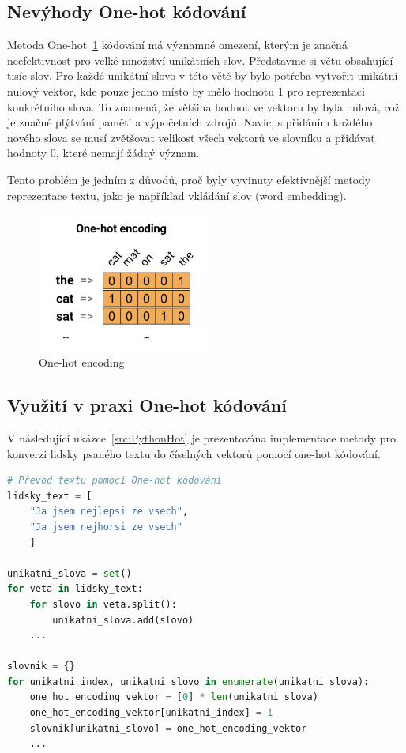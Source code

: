 \subsection{Nevýhody One-hot kódování}
Metoda One-hot~\ref{fig:One-hot encoding} kódování má významné omezení, kterým je značná neefektivnost pro velké množství unikátních slov.
Představme si větu obsahující tisíc slov.
Pro každé unikátní slovo v této větě by bylo potřeba vytvořit unikátní nulový vektor, kde pouze jedno místo by mělo hodnotu 1 pro reprezentaci konkrétního slova.
To znamená, že většina hodnot ve vektoru by byla nulová, což je značné plýtvání pamětí a výpočetních zdrojů.
Navíc, s přidáním každého nového slova se musí zvětšovat velikost všech vektorů ve slovníku a přidávat hodnoty 0, které nemají žádný význam.

Tento problém je jedním z důvodů, proč byly vyvinuty efektivnější metody reprezentace textu, jako je například vkládání slov (word embedding).

\begin{figure}[H]
	\centering
	\includegraphics[width=0.5\textwidth]{Figures/one-hot.png}
	\caption{One-hot encoding~\cite{link5}}\label{fig:One-hot encoding}
\end{figure}

\subsection{Využití v praxi One-hot kódování}
V následující ukázce~\ref{src:PythonHot} je prezentována implementace metody pro konverzi lidsky psaného textu do číselných vektorů pomocí one-hot kódování.

\begin{lstlisting}[language=Python,label=src:PythonHot,caption={One-hot kódování v praxi}]
# Převod textu pomocí One-hot kódování
lidsky_text = [
	"Ja jsem nejlepsi ze vsech",
    "Ja jsem nejhorsi ze vsech"
	]

unikatni_slova = set()
for veta in lidsky_text:
    for slovo in veta.split():
        unikatni_slova.add(slovo)
    ...

slovnik = {}
for unikatni_index, unikatni_slovo in enumerate(unikatni_slova):
    one_hot_encoding_vektor = [0] * len(unikatni_slova)
    one_hot_encoding_vektor[unikatni_index] = 1
    slovnik[unikatni_slovo] = one_hot_encoding_vektor
    ...
\end{lstlisting}

